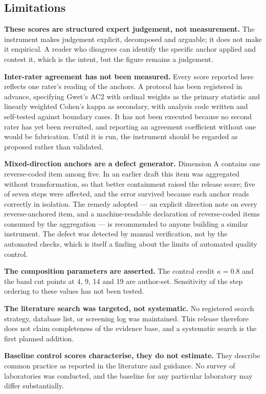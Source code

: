 \subsection{Limitations}
\label{sec:limitations}

\textbf{These scores are structured expert judgement, not measurement.} The instrument
makes judgement explicit, decomposed and arguable; it does not make it empirical. A reader
who disagrees can identify the specific anchor applied and contest it, which is the
intent, but the figure remains a judgement.

\textbf{Inter-rater agreement has not been measured.} Every score reported here reflects
one rater's reading of the anchors. A protocol has been registered in advance, specifying
Gwet's AC2 with ordinal weights as the primary statistic and linearly weighted Cohen's
kappa as secondary, with analysis code written and self-tested against boundary cases. It
has not been executed because no second rater has yet been recruited, and reporting an
agreement coefficient without one would be fabrication. Until it is run, the instrument
should be regarded as proposed rather than validated.

\textbf{Mixed-direction anchors are a defect generator.} Dimension A contains one
reverse-coded item among five. In an earlier draft this item was aggregated without
transformation, so that better containment raised the release score; five of seven steps
were affected, and the error survived because each anchor reads correctly in isolation.
The remedy adopted --- an explicit direction note on every reverse-anchored item, and a
machine-readable declaration of reverse-coded items consumed by the aggregation --- is
recommended to anyone building a similar instrument. The defect was detected by manual
verification, not by the automated checks, which is itself a finding about the limits of
automated quality control.

\textbf{The composition parameters are asserted.} The control credit $\kappa = 0.8$ and the
band cut points at 4, 9, 14 and 19 are author-set. Sensitivity of the step ordering to
these values has not been tested.

\textbf{The literature search was targeted, not systematic.} No registered search strategy,
database list, or screening log was maintained. This release therefore does not claim
completeness of the evidence base, and a systematic search is the first planned addition.

\textbf{Baseline control scores characterise, they do not estimate.} They describe common
practice as reported in the literature and guidance. No survey of laboratories was
conducted, and the baseline for any particular laboratory may differ substantially.

